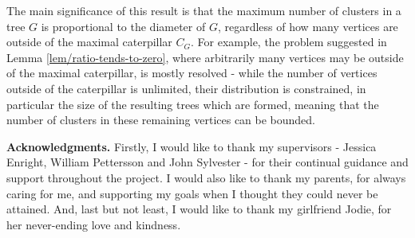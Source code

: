 \documentclass{mpaper}
\begin{document}
The main significance of this result is that the maximum number of clusters in a tree $G$ is proportional to the diameter of $G$, regardless of how many vertices are outside of the maximal caterpillar $C_G$. For example, the problem suggested in Lemma \ref{lem/ratio-tends-to-zero}, where arbitrarily many vertices may be outside of the maximal caterpillar, is mostly resolved - while the number of vertices outside of the caterpillar is unlimited, their distribution is constrained, in particular the size of the resulting trees which are formed, meaning that the number of clusters in these remaining vertices can be bounded.

{\bf Acknowledgments.}
Firstly, I would like to thank my supervisors - Jessica Enright, William Pettersson and John Sylvester - for their continual guidance and support throughout the project. I would also like to thank my parents, for always caring for me, and supporting my goals when I thought they could never be attained. And, last but not least, I would like to thank my girlfriend Jodie, for her never-ending love and kindness.



\end{document}
